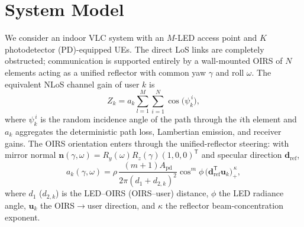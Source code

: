 \documentclass[conference]{IEEEtran}
\begin{document}
\section{System Model}
We consider an indoor VLC system with an $M$-LED access point and $K$
photodetector (PD)-equipped UEs. The direct LoS links are completely
obstructed; communication is supported entirely by a wall-mounted OIRS of $N$
elements acting as a unified reflector with common yaw $\gamma$ and roll
$\omega$. The equivalent NLoS channel gain of user $k$ is
\begin{equation}
Z_k = a_k \sum_{l=1}^{M}\sum_{i=1}^{N} \cos\bigl(\psi_k^{\,i}\bigr),
\label{eq:Zk}
\end{equation}
where $\psi_k^{\,i}$ is the random incidence angle of the path through the
$i$th element and $a_k$ aggregates the deterministic path loss, Lambertian
emission, and receiver gains. The OIRS orientation enters through the
unified-reflector steering: with mirror normal
$\mathbf n(\gamma,\omega)=R_y(\omega)R_z(\gamma)(1,0,0)^{\mathsf T}$ and
specular direction $\mathbf d_{\mathrm{ref}}$,
\begin{equation}
a_k(\gamma,\omega)=\rho\,\frac{(m+1)A_{\mathrm{pd}}}{2\pi (d_1+d_{2,k})^2}
\cos^m\!\phi\,
\bigl(\mathbf d_{\mathrm{ref}}^{\mathsf T}\mathbf u_k\bigr)_+^{\,\kappa},
\label{eq:ak}
\end{equation}
where $d_1$ ($d_{2,k}$) is the LED--OIRS (OIRS--user) distance, $\phi$ the
LED radiance angle, $\mathbf u_k$ the OIRS$\to$user direction, and $\kappa$
the reflector beam-concentration exponent.
\end{document}
